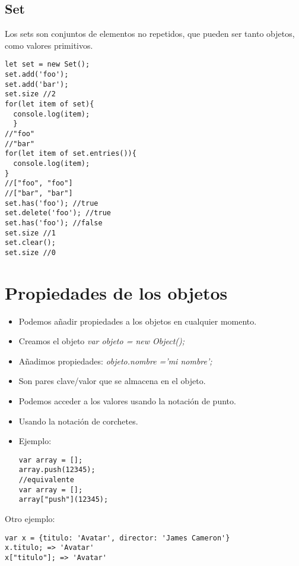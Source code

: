 \documentclass[4paper]{article}
\begin{document}
\subsection{Set}
Los sets son conjuntos de elementos no repetidos, que pueden ser tanto objetos, como valores primitivos.\\
\begin{lstlisting}
let set = new Set();
set.add('foo');
set.add('bar');
set.size //2
for(let item of set){
  console.log(item);
  }
//"foo"
//"bar"
for(let item of set.entries()){
  console.log(item);
}
//["foo", "foo"]
//["bar", "bar"]
set.has('foo'); //true
set.delete('foo'); //true
set.has('foo'); //false
set.size //1
set.clear();
set.size //0
\end{lstlisting}


\newpage
\section{Propiedades de los objetos}
\begin{itemize}
\item Podemos añadir propiedades a los objetos en cualquier momento.
\item Creamos el objeto \emph{var objeto = new Object();}
\item Añadimos propiedades: \emph{objeto.nombre ='mi nombre';}
\item Son pares clave/valor que se almacena en el objeto.
\item Podemos acceder a los valores usando la notación de punto. 
\item Usando la notación de corchetes.
\item Ejemplo:
\begin{lstlisting}
var array = [];
array.push(12345);
//equivalente
var array = [];
array["push"](12345);
\end{lstlisting}
\end{itemize}
Otro ejemplo:
\begin{lstlisting}
var x = {titulo: 'Avatar', director: 'James Cameron'}
x.titulo; => 'Avatar'
x["titulo"]; => 'Avatar'
\end{lstlisting}
\end{document}
